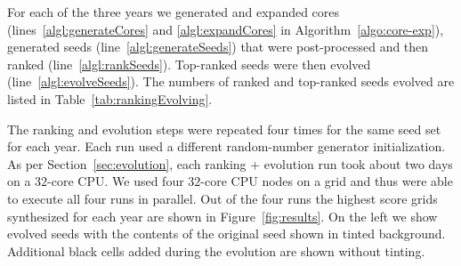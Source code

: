 For each of the three years we generated and expanded cores (lines~\ref{algl:generateCores} and \ref{algl:expandCores} in Algorithm~\ref{algo:core-exp}), generated seeds (line~\ref{algl:generateSeeds}) that were 
post-processed and then ranked (line~\ref{algl:rankSeeds}). Top-ranked seeds were then evolved (line~\ref{algl:evolveSeeds}). The numbers of ranked and top-ranked seeds evolved are listed in Table~\ref{tab:rankingEvolving}.

The ranking and evolution steps were repeated four times for the same seed set for each year. Each run used a different random-number generator initialization. As per Section~\ref{sec:evolution}, each ranking + evolution run took about two days on a $32$-core CPU. We used four $32$-core CPU nodes on a grid and thus were able to execute all four runs in parallel. Out of the four runs the highest score grids synthesized for each year are shown in Figure~\ref{fig:results}. On the left we show evolved seeds with the contents of the original seed shown in tinted background. Additional black cells added during the evolution are shown without tinting.

